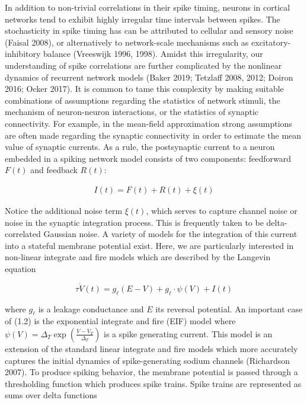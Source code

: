 \documentclass{ucetd}
\begin{document}
In addition to non-trivial correlations in their spike timing, neurons in cortical networks tend to exhibit highly irregular time intervals between spikes. The stochasticity in spike timing has can be attributed to cellular and sensory noise (Faisal 2008), or alternatively to network-scale mechanisms such as excitatory-inhibitory balance (Vreeswijk 1996, 1998). Amidst this irregularity, our understanding of spike correlations are further complicated by the nonlinear dynamics of recurrent network models (Baker 2019; Tetzlaff 2008, 2012; Doiron 2016; Ocker 2017). It is common to tame this complexity by making suitable combinations of assumptions regarding the statistics of network stimuli, the mechanism of neuron-neuron interactions, or the statistics of synaptic connectivity. For example, in the mean-field approximation strong assumptions are often made regarding the synaptic connectivity in order to estimate the mean value of synaptic currents. As a rule, the postsynaptic current to a neuron embedded in a spiking network model consists of two components: feedforward $F(t)$ and feedback $R(t)$:

\begin{align}
I(t) = F(t) + R(t) + \xi(t)
\end{align}

Notice the additional noise term $\xi(t)$, which serves to capture channel noise or noise in the synaptic integration process. This is frequently taken to be delta-correlated Gaussian noise. A variety of models for the integration of this current into a stateful membrane potential exist. Here, we are particularly interested in non-linear integrate and fire models which are described by the Langevin equation

\begin{equation}
\tau\dot{V}(t) = g_{\ell}(E - V) + g_{\ell}\cdot \psi(V) + I(t)
\end{equation}

where $g_{\ell}$ is a leakage conductance and $E$ its reversal potential. An important case of (1.2) is the exponential integrate and fire (EIF) model where $\psi(V) = \Delta_{T}\exp\left(\frac{V-V_{T}}{\Delta_{T}}\right)$ is a spike generating current. This model is an extension of the standard linear integrate and fire models which more accurately captures the initial dynamics of spike-generating sodium channels (Richardson 2007). To produce spiking behavior, the membrane potential is passed through a thresholding function which produces spike trains. Spike trains are represented as sums over delta functions
\end{document}
